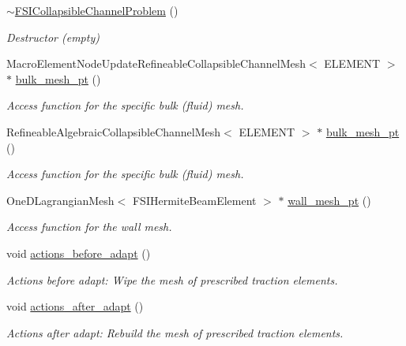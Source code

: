 \begin{DoxyCompactItemize}
\hyperlink{classFSICollapsibleChannelProblem_abe33aaaae15ea3eb10885527a1d1ad9a}{$\sim$\+F\+S\+I\+Collapsible\+Channel\+Problem} ()
\begin{DoxyCompactList}\small\item\em Destructor (empty) \end{DoxyCompactList}\item 
Macro\+Element\+Node\+Update\+Refineable\+Collapsible\+Channel\+Mesh$<$ E\+L\+E\+M\+E\+NT $>$ $\ast$ \hyperlink{classFSICollapsibleChannelProblem_a6c031288ea229296c10e5f41c7b3e99e}{bulk\+\_\+mesh\+\_\+pt} ()
\begin{DoxyCompactList}\small\item\em Access function for the specific bulk (fluid) mesh. \end{DoxyCompactList}\item 
Refineable\+Algebraic\+Collapsible\+Channel\+Mesh$<$ E\+L\+E\+M\+E\+NT $>$ $\ast$ \hyperlink{classFSICollapsibleChannelProblem_afa3825057e5875deda297c68eb893f74}{bulk\+\_\+mesh\+\_\+pt} ()
\begin{DoxyCompactList}\small\item\em Access function for the specific bulk (fluid) mesh. \end{DoxyCompactList}\item 
One\+D\+Lagrangian\+Mesh$<$ F\+S\+I\+Hermite\+Beam\+Element $>$ $\ast$ \hyperlink{classFSICollapsibleChannelProblem_ae8b71da8da82f3c52387052ce400b930}{wall\+\_\+mesh\+\_\+pt} ()
\begin{DoxyCompactList}\small\item\em Access function for the wall mesh. \end{DoxyCompactList}\item 
void \hyperlink{classFSICollapsibleChannelProblem_a91b30b3d0369c178d3a79f5658644f1b}{actions\+\_\+before\+\_\+adapt} ()
\begin{DoxyCompactList}\small\item\em Actions before adapt\+: Wipe the mesh of prescribed traction elements. \end{DoxyCompactList}\item 
void \hyperlink{classFSICollapsibleChannelProblem_ae20eb7ed895e0063ade5a6d0c6f9af2f}{actions\+\_\+after\+\_\+adapt} ()
\begin{DoxyCompactList}\small\item\em Actions after adapt\+: Rebuild the mesh of prescribed traction elements. \end{DoxyCompactList}\item 

\end{DoxyCompactItemize}
